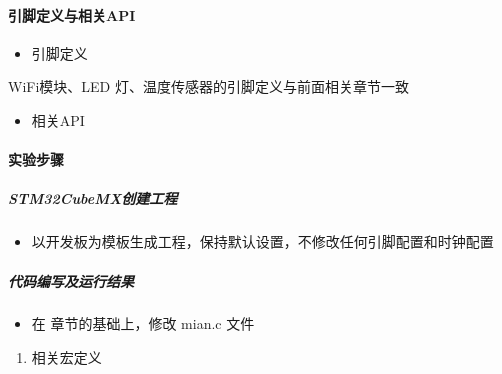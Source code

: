 \documentclass[a4paper,12pt,english]{sphinxmanual}
\begin{document}
\paragraph{引脚定义与相关API}
\label{\detokenize{exp-stm32/wifi/http-over-wifi:api}}\begin{itemize}
\item {} 
\sphinxAtStartPar
引脚定义

\end{itemize}

\sphinxAtStartPar
WiFi模块、LED 灯、温度传感器的引脚定义与前面相关章节一致
\begin{itemize}
\item {} 
\sphinxAtStartPar
相关API

\end{itemize}


\paragraph{实验步骤}
\label{\detokenize{exp-stm32/wifi/http-over-wifi:id6}}

\subparagraph{STM32CubeMX创建工程}
\label{\detokenize{exp-stm32/wifi/http-over-wifi:stm32cubemx}}\begin{itemize}
\item {} 
\sphinxAtStartPar
以开发板为模板生成工程，保持默认设置，不修改任何引脚配置和时钟配置

\end{itemize}


\subparagraph{代码编写及运行结果}
\label{\detokenize{exp-stm32/wifi/http-over-wifi:id7}}\begin{itemize}
\item {} 
\sphinxAtStartPar
在  章节的基础上，修改 mian.c 文件

\end{itemize}
\begin{enumerate}
%
\item {} 
\sphinxAtStartPar
相关宏定义

\end{enumerate}
\end{document}
